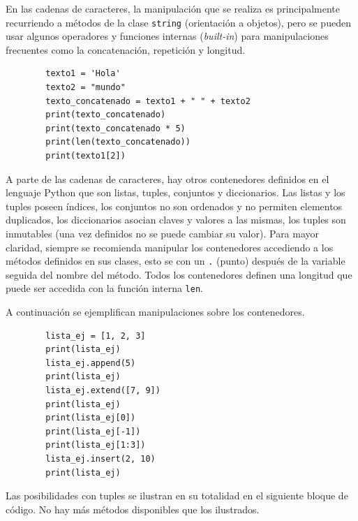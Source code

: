 En las cadenas de caracteres, la manipulación que se realiza es
principalmente recurriendo a métodos de la clase \texttt{string}
(orientación a objetos), pero se pueden usar algunos operadores y
funciones internas (\emph{built-in}) para manipulaciones frecuentes como
la concatenación, repetición y longitud.

\begin{listing}[H]
    \begin{verbatim}
        texto1 = 'Hola' 
        texto2 = "mundo"
        texto_concatenado = texto1 + " " + texto2 
        print(texto_concatenado)
        print(texto_concatenado * 5) 
        print(len(texto_concatenado))
        print(texto1[2]) 
    \end{verbatim}
\end{listing}


A parte de las cadenas de caracteres, hay otros contenedores definidos
en el lenguaje Python que son listas, tuples, conjuntos y diccionarios.
Las listas y los tuples poseen índices, los conjuntos no son ordenados y
no permiten elementos duplicados, los diccionarios asocian claves y
valores a las mismas, los tuples son inmutables (una vez definidos no se
puede cambiar su valor). Para mayor claridad, siempre se recomienda
manipular los contenedores accediendo a los métodos definidos en sus
clases, esto se con un \texttt{.} (punto) después de la variable seguida
del nombre del método. Todos los contenedores definen una longitud que
puede ser accedida con la función interna \texttt{len}.

A continuación se ejemplifican manipulaciones sobre los contenedores.

\begin{listing}[H]
    \begin{verbatim}
        lista_ej = [1, 2, 3]
        print(lista_ej)
        lista_ej.append(5)
        print(lista_ej)
        lista_ej.extend([7, 9])
        print(lista_ej)
        print(lista_ej[0])
        print(lista_ej[-1])
        print(lista_ej[1:3])
        lista_ej.insert(2, 10) 
        print(lista_ej)
    \end{verbatim}
\end{listing}


Las posibilidades con tuples se ilustran en su totalidad en el siguiente
bloque de código. No hay más métodos disponibles que los ilustrados.

